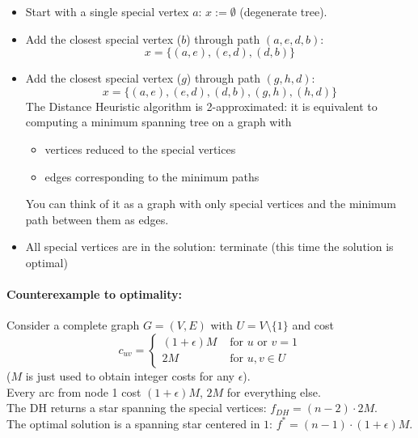 \begin{itemize}
	\item Start with a single special vertex $a$: $x := \emptyset$ (degenerate tree).\\
	
	\item Add the closest special vertex ($b$) through path $(a, e, d, b)$:
	$$ x = \{(a, e) , (e, d) , (d, b)\} $$
	
	\item Add the closest special vertex ($g$) through path $(g , h, d)$:
	$$ x = \{(a, e) , (e, d) , (d, b) , (g , h) , (h, d)\} $$
	The Distance Heuristic algorithm is 2-approximated: it is equivalent to computing a minimum spanning tree on a graph with
	\begin{itemize}
		\item vertices reduced to the special vertices
		\item edges corresponding to the minimum paths
	\end{itemize}
	You can think of it as a graph with only special vertices and the minimum path between them as edges.\\
	
	\item All special vertices are in the solution: terminate (this time the solution is optimal)
\end{itemize}

\newpage

\paragraph{Counterexample to optimality:} Consider a complete graph $G = (V , E )$ with $U = V \setminus \{1\}$ and cost
$$ 
c_{uv} = \begin{cases}
	(1 + \epsilon)M & \text{ for } u \text{ or } v = 1 \\
	2M & \text{ for } u,v \in U
\end{cases}
$$
($M$ is just used to obtain integer costs for any $\epsilon$).\\
Every arc from node 1 cost $(1 + \epsilon)M$, $2M$ for everything else.\\

The DH returns a star spanning the special vertices: $f_{DH} = (n − 2) \cdot 2M$.\\

The optimal solution is a spanning star centered in $1$: $f^\ast = (n − 1) \cdot (1 + \epsilon)M$.

